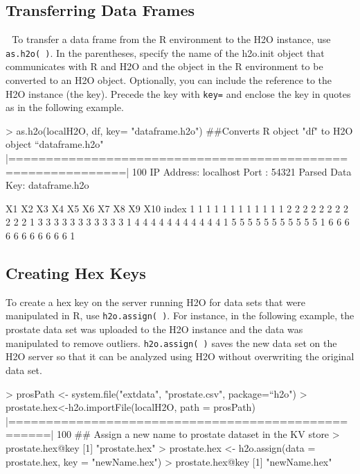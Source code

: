 \documentclass[11pt]{article}
\begin{document}
\subsection{Transferring Data Frames} 
To transfer a data frame from the R environment to the H2O instance, use  {\texttt{as.h2o( )}}. In the parentheses, specify the name of the h2o.init object that communicates with R and H2O and the object in the R environment to be converted to an H2O object. Optionally, you can include the reference to the H2O instance (the key). Precede the key with {\texttt{key=}} and enclose the key in quotes as in the following example. 

\begin{spverbatim}
> as.h2o(localH2O, df, key= "dataframe.h2o")
##Converts R object "df" to H2O object “dataframe.h2o"
  |=============================================================| 100%
IP Address: localhost 
Port      : 54321 
Parsed Data Key: dataframe.h2o 

  X1 X2 X3 X4 X5 X6 X7 X8 X9 X10 index
1  1  1  1  1  1  1  1  1  1   1     1
2  2  2  2  2  2  2  2  2  2   2     1
3  3  3  3  3  3  3  3  3  3   3     1
4  4  4  4  4  4  4  4  4  4   4     1
5  5  5  5  5  5  5  5  5  5   5     1
6  6  6  6  6  6  6  6  6  6   6     1
\end{spverbatim}


\subsection{Creating Hex Keys}

To create a hex key on the server running H2O for data sets that were manipulated in R, use {\texttt{h2o.assign( )}}. For instance, in the following example, the prostate data set was uploaded to the H2O instance and the data was manipulated to remove outliers. {\texttt{h2o.assign( )}} saves the new data set on the H2O server so that it can be analyzed using H2O without overwriting the original data set.  

\begin{spverbatim}
> prosPath <- system.file("extdata", "prostate.csv", package=“h2o")
> prostate.hex<-h2o.importFile(localH2O, path = prosPath)
    |===================================================| 100%
## Assign a new name to prostate dataset in the KV store
> prostate.hex@key
[1] "prostate.hex"
> prostate.hex <- h2o.assign(data = prostate.hex, key = "newName.hex")
> prostate.hex@key
[1] "newName.hex"

\end{spverbatim}
\end{document}
